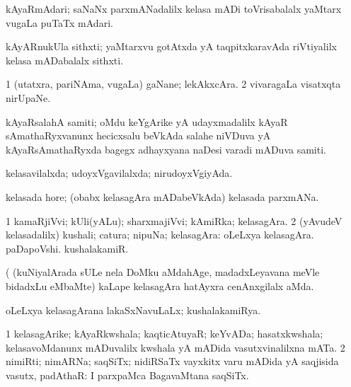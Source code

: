 \bentry
{} 
\gl{\nA}
\expl{}
\bmng
kAyaRmAdari; saNaNx parxmANadalilx kelasa mADi toVrisabalalx yaMtarx \mo vugaLa puTaTx mAdari. 
\emng
\eentry

\bentry
{} 
\gl{\nA}
\expl{}
\bmng
kAyARnukUla sithxti; yaMtarxvu gotAtxda yA taqpitxkaravAda riVtiyalilx kelasa mADabalalx sithxti. 
\emng
\eentry

\bentry
{} 
\gl{\nA}
\expl{}
\bmng
\bnum
\num{1} (utatxra, pariNAma, \mo vugaLa) gaNane; lekAkxcAra. 
\num{2} vivaragaLa visatxqta nirUpaNe. 
\enum
\emng
\eentry

\bentry
{} 
\gl{\nA}
\expl{}
\bmng
kAyaRsalahA samiti; oMdu keYgArike yA udayxmadalilx kAyaR sAmathaRyxvanunx hecicxsalu beVkAda salahe niVDuva yA kAyaRsAmathaRyxda bagegx adhayxyana naDesi varadi mADuva samiti. 
\emng
\eentry

\bentry
{} 
\gl{\gu}
\expl{}
\bmng
kelasavilalxda; udoyxVgavilalxda; nirudoyxVgiyAda. 
\emng
\eentry

\bentry
{} 
\gl{\nA}
\expl{}
\bmng
kelasada hore; (obabx kelasagAra mADabeVkAda) kelasada parxmANa. 
\emng
\eentry

\bentry
{} 
\gl{\nA}
\bmng
\bnum
\num{1} kamaRjiVvi; kUli(yALu); sharxmajiVvi; kAmiRka; kelasagAra. 
\num{2} (yAvudeV kelasadalilx) kushali; catura; nipuNa; kelasagAra:  oLeLxya kelasagAra.  paDapoVshi.  kushalakamiR. 
\enum
\emng

\noindent
\gl{\pagu}
\expl{}
\bmng
{} (  (kuNiyalArada sULe nela DoMku aMdahAge, madadxLeyavana meVle bidadxLu eMbaMte) kaLape kelasagAra hatAyxra cenAnxgilalx aMda. 
\emng
\eentry

\bentry
{} 
\gl{\gu}
\expl{}
\bmng
oLeLxya kelasagArana lakaSxNavuLaLx; kushalakamiRya. 
\emng
\eentry

\bentry
{} 
\gl{\nA}
\expl{}
\bmng
\bnum
\num{1} kelasagArike; kAyaRkwshala; kaqticAtuyaR; keYvADa; hasatxkwshala; kelasavoMdanunx mADuvalilx kwshala yA mADida vasutxvinalilxna mATa. 
\num{2} nimiRti; nimARNa; saqSiTx; nidiRSaTx vayxkitx \mo varu mADida yA saqjisida vasutx, padAthaR:  I parxpaMca BagavaMtana saqSiTx. 
\enum
\emng
\eentry

